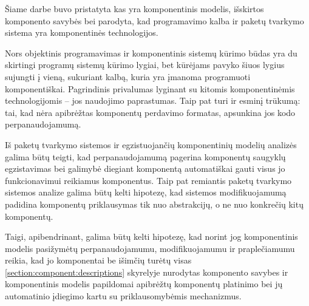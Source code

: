 

Šiame darbe buvo pristatyta kas yra komponentinis modelis, išskirtos
komponento savybės bei parodyta, kad  programavimo
kalba ir  paketų tvarkymo sistema yra komponentinės
technologijos.

Nors objektinis programavimas ir komponentinis sistemų kūrimo būdas
yra du skirtingi programų sistemų kūrimo lygiai, bet
 kūrėjams pavyko šiuos lygius sujungti į vieną,
sukuriant kalbą, kuria yra įmanoma programuoti komponentiškai.
Pagrindinis  privalumas lyginant su kitomis
komponentinėmis technologijomis – jos naudojimo paprastumas. Taip pat
 turi ir esminį trūkumą: tai, kad nėra apibrėžtas
 komponentų perdavimo formatas, apsunkina jos kodo
perpanaudojamumą.

Iš  paketų tvarkymo sistemos ir egzistuojančių
komponentinių modelių analizės galima būtų teigti, kad
perpanaudojamumą pagerina komponentų saugyklų egzistavimas bei galimybė
diegiant komponentą automatiškai gauti visus jo funkcionavimui
reikiamus komponentus. Taip pat remiantis  paketų
tvarkymo sistemos analize galima būtų kelti hipotezę, kad
sistemos modifikuojamumą padidina komponentų priklausymas tik nuo
abstrakcijų, o ne nuo konkrečių kitų komponentų.

Taigi, apibendrinant, galima būtų kelti hipotezę, kad norint jog
komponentinis modelis pasižymėtų perpanaudojamumu, modifikuojamumu ir
praplečiamumu reikia, kad jo komponentai be išimčių turėtų visas
\ref{section:component:descriptions} skyrelyje nurodytas komponento
savybes ir komponentinis modelis papildomai apibrėžtų komponentų
platinimo bei jų automatinio įdiegimo kartu su priklausomybėmis
mechanizmus.
